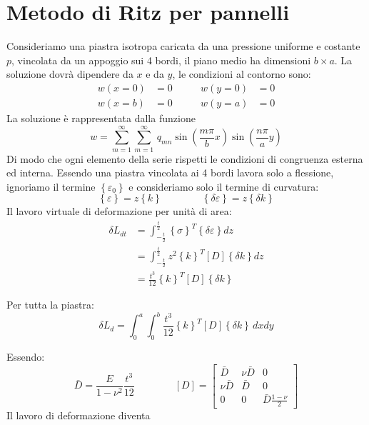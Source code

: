 \section{Metodo di Ritz per pannelli}

Consideriamo una piastra isotropa caricata da una pressione uniforme e costante $p$, vincolata da un appoggio sui 4 bordi, il piano medio ha dimensioni $b\times a$. La soluzione dovrà dipendere da $x$ e da $y$, le condizioni al contorno sono:
\begin{align*}
    w(x=0)&=0\qquad &w(y=0)&=0\\
    w(x=b)&=0\qquad &w(y=a)&=0
\end{align*}
La soluzione è rappresentata dalla funzione
\begin{equation*}
    w= \sum^\infty_{m=1}  \sum^\infty_{m=1}\,q_{mn}\sin{\left(\frac{m\pi}{b}x\right)}  \sin{\left(\frac{n\pi}{a}y\right)}
\end{equation*}
Di modo che ogni elemento della serie rispetti le condizioni di congruenza esterna ed interna.
Essendo una piastra vincolata ai 4 bordi lavora solo a flessione, ignoriamo il termine $\left\{\varepsilon_0 \right\}$ e consideriamo solo il termine di curvatura:
\begin{equation*}
    \left\{\varepsilon \right\}=z\left\{k \right\}\qquad\qquad    \left\{\delta\varepsilon \right\}=z\left\{\delta k \right\}
\end{equation*}
Il lavoro virtuale di deformazione per unità di area:
\begin{align*}
 \delta L_{dt}  &= \int_{-\frac{t}{2}}^{\frac{t}{2}}      \left\{\sigma\right\}^T   \left\{\delta\varepsilon\right\}dz\\
   &= \int_{-\frac{t}{2}}^{\frac{t}{2}}    z^2  \left\{k\right\}^T   [D]\left\{\delta k\right\}dz\\
   &= \frac{t^3}{12} \left\{k\right\}^T   [D]\left\{\delta k\right\}
\end{align*}

Per tutta la piastra:
\begin{equation*}
    \delta L_d=\int_0^a\int_0^b \frac{t^3}{12} \left\{k\right\}^T   [D]\left\{\delta k\right\}\,dx dy
\end{equation*}

Essendo:
\begin{equation*}
    \bar{D}=\frac{E}{1-\nu^2}\frac{t^3}{12} \qquad\qquad
[D]=\left[
\begin{array}{ccc}
\displaystyle \bar{D} & \displaystyle \nu\bar{D} & \displaystyle 0\\
\displaystyle \nu\bar{D} & \displaystyle \bar{D} & \displaystyle 0 \\
\displaystyle 0& \displaystyle 0 & \displaystyle \bar{D}\frac{1-\nu}{2}
\end{array}
\right]    
\end{equation*}
Il lavoro di deformazione diventa


